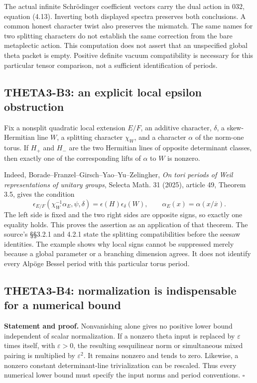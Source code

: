 \documentclass[11pt]{article}
\theoremstyle{definition}\newtheorem{definition}[theorem]{Definition}\newtheorem{remark}[theorem]{Remark}
\begin{document}
The actual infinite Schr\"odinger coefficient vectors carry the dual action in 032, equation (4.13). Inverting both displayed spectra preserves both conclusions. A common honest character twist also preserves the mismatch. The same names for two splitting characters do not establish the same correction from the bare metaplectic action. This computation does not assert that an unspecified global theta packet is empty. Positive definite vacuum compatibility is necessary for this particular tensor comparison, not a sufficient identification of periods.

\subsection{THETA3-B3: an explicit local epsilon obstruction}\label{B3}

Fix a nonsplit quadratic local extension $E/F$, an additive character, $\delta$, a skew-Hermitian line $W$, a splitting character $\chi_W$, and a character $\alpha$ of the norm-one torus. If $H_+$ and $H_-$ are the two Hermitian lines of opposite determinant classes, then exactly one of the corresponding lifts of $\alpha$ to $W$ is nonzero.

Indeed, Borade--Franzel--Girsch--Yao--Yu--Zelingher, \emph{On tori periods of Weil representations of unitary groups}, Selecta Math. 31 (2025), article 49, Theorem 3.5, gives the condition
\[
 \epsilon_{E/F}(\chi_W^{-1}\alpha_E,\psi,\delta)
       =\epsilon(H)\epsilon_\delta(W),
 \qquad \alpha_E(x)=\alpha(x/\overline x).
\]
The left side is fixed and the two right sides are opposite signs, so exactly one equality holds. This proves the assertion as an application of that theorem. The source's \S\S3.2.1 and 4.2.1 state the splitting compatibilities before the seesaw identities. The example shows why local signs cannot be suppressed merely because a global parameter or a branching dimension agrees. It does not identify every Alp\"oge Bessel period with this particular torus period.

\subsection{THETA3-B4: normalization is indispensable for a numerical bound}\label{B4}

\textbf{Statement and proof.} Nonvanishing alone gives no positive lower bound independent of scalar normalization. If a nonzero theta input is replaced by $\varepsilon$ times itself, with $\varepsilon>0$, the resulting sesquilinear norm or simultaneous mixed pairing is multiplied by $\varepsilon^2$. It remains nonzero and tends to zero. Likewise, a nonzero constant determinant-line trivialization can be rescaled. Thus every numerical lower bound must specify the input norms and period conventions. \hfill$\square$
\end{document}
